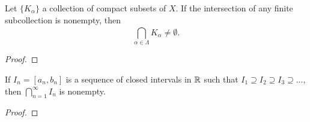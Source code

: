 \documentclass[a4paper]{report}
\begin{document}
\begin{theorem}[ ]\label{Theorem 2.36}
    Let \( \{ {K}_{\alpha} \}   \) a collection of compact subsets of \( X  \). If the intersection of any finite subcollection is nonempty, then
    \[  \bigcap_{ \alpha \in \Lambda }^{  } {K}_{\alpha} \neq \emptyset. \]
\end{theorem}
\begin{proof}

\end{proof}


\begin{theorem}
    If \( {I}_{n} = [{a}_{n}, {b}_{n}] \) is a sequence of closed intervals in \( \mathbb{R}  \) such that \( {I}_{1} \supseteq {I}_{2} \supseteq {I}_{3} \supseteq \dots  \), then \( \bigcap_{ n=1  }^{ \infty   }  {I}_{n} \) is nonempty. 
\end{theorem}
\begin{proof}

\end{proof}
\end{document}
